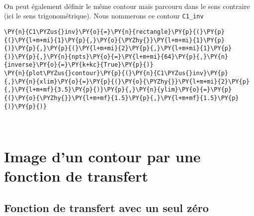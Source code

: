     \begin{center}
    \end{center}
    { \hspace*{\fill} \\}
    
    On peut également définir le même contour mais parcouru dans le sens
contraire (ici le sens trigonométrique). Nous nommerons ce contour
\texttt{C1\_inv}

    \begin{tcolorbox}[breakable, size=fbox, boxrule=1pt, pad at break*=1mm,colback=cellbackground, colframe=cellborder]
\begin{Verbatim}[commandchars=\\\{\}]
\PY{n}{C1\PYZus{}inv}\PY{o}{=}\PY{n}{rectangle}\PY{p}{(}\PY{p}{(}\PY{l+m+mi}{1}\PY{p}{,}\PY{o}{\PYZhy{}}\PY{l+m+mi}{1}\PY{p}{)}\PY{p}{,}\PY{p}{(}\PY{l+m+mi}{2}\PY{p}{,}\PY{l+m+mi}{1}\PY{p}{)}\PY{p}{,}\PY{n}{npts}\PY{o}{=}\PY{l+m+mi}{64}\PY{p}{,}\PY{n}{inverse}\PY{o}{=}\PY{k+kc}{True}\PY{p}{)}
\PY{n}{plot\PYZus{}contour}\PY{p}{(}\PY{n}{C1\PYZus{}inv}\PY{p}{,}\PY{n}{xlim}\PY{o}{=}\PY{p}{(}\PY{o}{\PYZhy{}}\PY{l+m+mi}{2}\PY{p}{,}\PY{l+m+mf}{3.5}\PY{p}{)}\PY{p}{,}\PY{n}{ylim}\PY{o}{=}\PY{p}{(}\PY{o}{\PYZhy{}}\PY{l+m+mf}{1.5}\PY{p}{,}\PY{l+m+mf}{1.5}\PY{p}{)}\PY{p}{)}
\end{Verbatim}
\end{tcolorbox}

    \begin{center}
    \end{center}
    { \hspace*{\fill} \\}
    
    \hypertarget{image-dun-contour-par-une-fonction-de-transfert}{%
\section{Image d'un contour par une fonction de
transfert}\label{image-dun-contour-par-une-fonction-de-transfert}}

\hypertarget{fonction-de-transfert-avec-un-seul-zuxe9ro}{%
\subsection{Fonction de transfert avec un seul
zéro}\label{fonction-de-transfert-avec-un-seul-zuxe9ro}}

